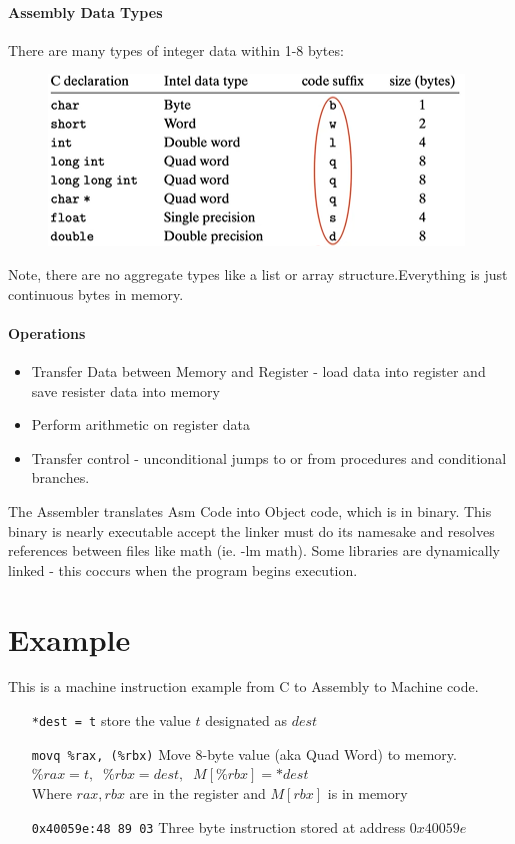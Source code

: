\documentclass[12pt]{book}
\begin{document}
\paragraph{Assembly Data Types}
There are many types of integer data within 1-8 bytes:
\begin{figure}[h]
        \centering
        \includegraphics[scale = 0.5]{./figures/mechTypes}
\end{figure}
Note, there are no aggregate types like a list or array structure.Everything is just continuous bytes in memory.

\paragraph{Operations}
\begin{itemize}
        \item Transfer Data between Memory and Register - load data into register and save resister data into memory
        \item Perform arithmetic on register data
        \item Transfer control - unconditional jumps to or from procedures and conditional branches.
\end{itemize}

The Assembler translates Asm Code into Object code, which is in binary. This binary is nearly executable accept the linker must
do its namesake and resolves references between files like math (ie. -lm math). Some libraries are dynamically linked - this coccurs 
when the program begins execution.

\section*{Example}
This is a machine instruction example from C to Assembly to Machine code.
\begin{itemize}
        \item[\texttt{*dest = t}] store the value $t$ designated as  $dest$
        \item[\texttt{movq \%rax, (\%rbx)}] Move 8-byte value (aka Quad Word) to memory.\\
                $\%rax = t, \;\; \%rbx = dest, \;\; M[\%rbx] = \text{*}dest$\\
                Where $rax, rbx$ are in the register and  $M[rbx]$ is in memory
        \item[\texttt{0x40059e:48 89 03}] Three byte instruction stored at address $0x40059e$
\end{itemize}
\pagebreak
\end{document}
